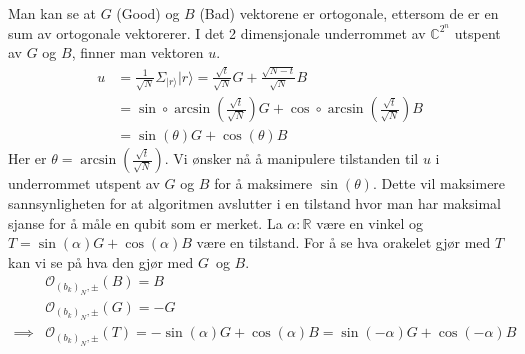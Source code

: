     Man kan se at $G$ (Good) og $B$ (Bad) vektorene er ortogonale, ettersom de er en sum av ortogonale vektorerer. I det 2 dimensjonale underrommet av $\mathbb{C}^{2^n}$ utspent av $G$ og $B$, finner man vektoren $u$.
    \begin{align*}
        u & = \frac{1}{\sqrt{N}}\Sigma_{|r\rangle}|r\rangle = \frac{\sqrt{t}}{\sqrt{N}}G + \frac{\sqrt{N-t}}{\sqrt{N}}B \\
        & = \sin\circ\arcsin(\frac{\sqrt{t}}{\sqrt{N}})G+\cos\circ\arcsin(\frac{\sqrt{t}}{\sqrt{N}})B \\
        & = \sin(\theta)G+\cos(\theta)B
    \end{align*}
    Her er $\theta = \arcsin(\frac{\sqrt{t}}{\sqrt{N}})$. Vi ønsker nå å manipulere tilstanden til $u$ i underrommet utspent av $G$ og $B$ for å maksimere $\sin(\theta)$. Dette vil maksimere sannsynligheten for at algoritmen avslutter i en tilstand hvor man har maksimal sjanse for å måle en qubit som er merket. La $\alpha:\mathbb{R}$ være en vinkel og $T = \sin(\alpha)G+\cos(\alpha)B$ være en tilstand. For å se hva orakelet gjør med $T$ kan vi se på hva den gjør med $G$ og $B$. 
    \begin{align*}
        & \mathcal{O}_{(b_k)_N, \pm}(B) = B \\
        & \mathcal{O}_{(b_k)_N, \pm}(G) = -G \\
        \implies & \mathcal{O}_{(b_k)_N,\pm}(T)=-\sin(\alpha)G+\cos(\alpha)B = \sin(-\alpha)G+\cos(-\alpha)B
    \end{align*}

